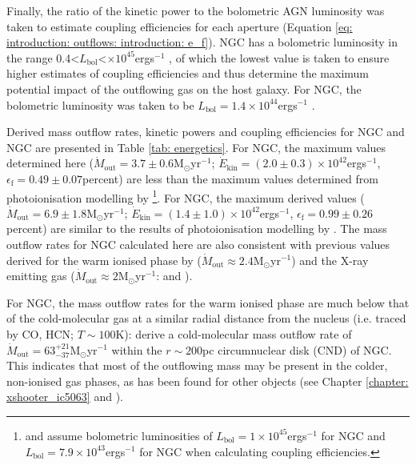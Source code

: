 Finally, the ratio of the kinetic power to the bolometric AGN luminosity was taken to estimate coupling efficiencies for each aperture (Equation \ref{eq: introduction: outflows: introduction: e_f}). NGC has a bolometric luminosity in the range 0.4\;\textless\;$L_\mathrm{bol}$\textless{}$\times10^{45}$\;erg\;s$^{-1}$ \citep{Woo2002, AlonsoHerrero2011, LopezRodriguez2018, Gravity2020}, of which the lowest value is taken to ensure higher estimates of coupling efficiencies and thus determine the maximum potential impact of the outflowing gas on the host galaxy. For NGC, the bolometric luminosity was taken to be $L_\mathrm{bol}=1.4\times10^{44}$\;erg\;s$^{-1}$ \citep{Kraemer2020}.

Derived mass outflow rates, kinetic powers and coupling efficiencies for NGC and NGC are presented in Table \ref{tab: energetics}. For NGC, the maximum values determined here ($\dot{M}_\mathrm{out}=3.7\pm0.6$\;M$_\odot$\;yr$^{-1}$; $\dot{E}_\mathrm{kin}=(2.0\pm0.3)\times10^{42}$\;erg\;s$^{-1}$, $\epsilon_\mathrm{f}=0.49\pm0.07$\;per\;cent) are less than the maximum values determined from photoionisation modelling by \citet{Revalski2021}\footnote{\citet{Crenshaw2015} and \citet{Revalski2021} assume bolometric luminosities of $L_\mathrm{bol}=1\times10^{45}$\;erg\;s$^{-1}$ for NGC and $L_\mathrm{bol}=7.9\times10^{43}$\;erg\;s$^{-1}$ for NGC when calculating coupling efficiencies.}. For NGC, the maximum derived values ($\dot{M}_\mathrm{out}=6.9\pm1.8$\;M$_\odot$\;yr$^{-1}$; $\dot{E}_\mathrm{kin}=(1.4\pm1.0)\times10^{42}$\;erg\;s$^{-1}$,  $\epsilon_\mathrm{f}=0.99\pm0.26$\;per\;cent) are similar to the results of photoionisation modelling by \citet{Crenshaw2015}. The mass outflow rates for NGC calculated here are also consistent with previous values derived for the warm ionised phase by \citet{Storchi-Bergmann2010} ($\dot{M}_\mathrm{out}\approx2.4$\;M$_\odot$\;yr$^{-1}$) and the X-ray emitting gas ($\dot{M}_\mathrm{out}\approx2$\;M$_\odot$\;yr$^{-1}$: \citealt{Wang2011} and \citealt{Kraemer2020}).

For NGC, the mass outflow rates for the warm ionised phase are much below that of the cold-molecular gas at a similar radial distance from the nucleus (i.e. traced by CO, HCN; $T\sim100$\;K): \citet{GarciaBurillo2014} derive a cold-molecular mass outflow rate of $\dot{M}_\mathrm{out}=63^{+21}_{-37}$\;M$_\odot$\;yr$^{-1}$ within the $r\sim200$\;pc circumnuclear disk (CND) of NGC. This indicates that most of the outflowing mass may be present in the colder, non-ionised gas phases, as has been found for other objects (see Chapter \ref{chapter: xshooter_ic5063} and \citealt{RamosAlmeida2019}).

